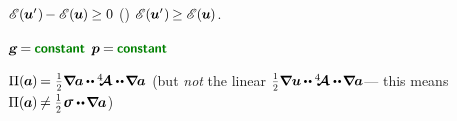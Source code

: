 \vspace{-0.2em}\noindent
{}
${
   {\mathscr{E}\hspace{-0.2ex}} \hspace{.16ex}
   (\hspace{-0.1ex} \bm{u}' \hspace{.1ex}) \hspace{-0.2ex}
   - {\mathscr{E}\hspace{-0.2ex}} \hspace{.16ex}
   (\hspace{-0.1ex} \bm{u} \hspace{-0.1ex}) \hspace{-0.1ex}
   \geq 0
}$
()
${
   {\mathscr{E}\hspace{-0.2ex}} \hspace{.16ex}
   (\hspace{-0.1ex}\bm{u}'\hspace{.1ex})
   \hspace{-0.2ex} \geq
   {\mathscr{E}\hspace{-0.2ex}} \hspace{.16ex}
   (\hspace{-0.1ex}\bm{u}\hspace{-0.1ex})
}$.

${ \volumeloadvector \hspace{-0.2ex} = \hspace{-0.1ex} \boldconstant }$
${ \bm{p} \hspace{-0.1ex} = \hspace{-0.1ex} \boldconstant }$

${\potentialenergydensity (\hspace{-0.1ex}\bm{a}\hspace{-0.1ex}) \hspace{-0.2ex} = \hspace{.1ex} \smallerdisplaystyleonehalf \boldnabla \hspace{-0.1ex} \bm{a} \hspace{-0.1ex} \dotdotp \hspace{-0.1ex} \stiffnesstensor \dotdotp \hspace{-0.25ex} \boldnabla \hspace{-0.1ex} \bm{a}}$
(but \emph{not} the linear ${\smallerdisplaystyleonehalf \boldnabla \bm{u} \hspace{-0.1ex} \dotdotp \hspace{-0.1ex} \stiffnesstensor \dotdotp \hspace{-0.25ex} \boldnabla \hspace{-0.1ex} \bm{a}}$\:--- this means ${\potentialenergydensity (\hspace{-0.1ex}\bm{a}\hspace{-0.1ex}) \hspace{-0.2ex} \neq \smallerdisplaystyleonehalf \hspace{.1ex} \linearstress \dotdotp \hspace{-0.25ex} \boldnabla \hspace{-0.1ex} \bm{a}}$)

